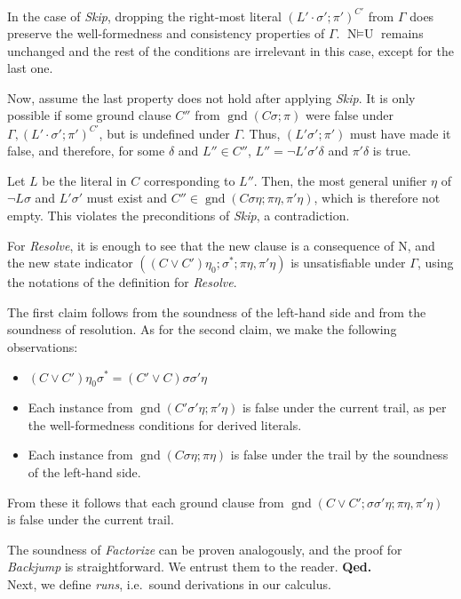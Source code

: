 \documentclass[a4paper]{article}
\newcommand{\mGnd}{\operatorname{gnd}} \newcommand{\mLVar}{\operatorname{lvar}} \newcommand{\mRVar}{\operatorname{rvar}} \newcommand{\mDmn}{\operatorname{dom}} \newcommand{\mRng}{\operatorname{rng}} \newcommand{\mMGU}{\operatorname{mgu}} \newcommand{\mDef}{\operatorname{def}} \newcommand{\mDomain}{\mathcal{D}} \newcommand{\mVar}{\operatorname{var}}
\newcommand{\finishproof}{{\bf Qed.}}
\newcommand{\leaveabit}{\\[6 pt]}
\begin{document}
In the case of \emph{Skip}, dropping the right-most literal $(L'\cdot\sigma'; \pi')^{C'}$ from $\Gamma$ does preserve 
the well-formedness and consistency properties of $\Gamma$. 
$\text{N} \models \text{U}$ remains unchanged and the rest 
of the conditions are irrelevant in this case, except for the last one.

Now, assume the last property does not hold after applying \emph{Skip}. It is only possible if some 
ground clause $C''$ from $\mGnd(C\sigma; \pi)$ were false under $\Gamma, (L'\cdot\sigma'; \pi')^{C'}$, but is undefined
under $\Gamma$. Thus, $(L'\sigma'; \pi')$ must have made it false, and therefore, for some $\delta$ and $L''\in C''$, 
$L'' = \neg L'\sigma'\delta$ and $\pi'\delta$ is true. 

Let $L$ be the literal in $C$ corresponding to $L''$. Then, the most general unifier $\eta$ of $\neg L\sigma$ and $L'\sigma'$ 
must exist and $C'' \in \mGnd(C\sigma\eta; \pi\eta, \pi'\eta)$, which is therefore not empty. This violates the 
preconditions of \emph{Skip}, a contradiction.

For \emph{Resolve}, it is enough to see that the new clause is a consequence of $\text{N}$, and the new 
state indicator $((C\lor C')\eta_0; \sigma^*; \pi\eta, \pi'\eta)$ is unsatisfiable under $\Gamma$, using the notations of 
the definition for \emph{Resolve}.

The first claim follows from the soundness of the left-hand side and from the soundness of resolution.
As for the second claim, we make the following observations:
\begin{itemize}
  \item $(C\lor C')\eta_0\sigma^* = (C' \lor C)\sigma\sigma'\eta$
	\item Each instance from $\mGnd(C'\sigma'\eta;\pi'\eta)$ is false under the current trail, as per the well-formedness conditions for derived literals.
	\item Each instance from $\mGnd(C\sigma\eta; \pi\eta)$ is false under the trail by the soundness of the left-hand side.
\end{itemize}
From these it follows that each ground clause from $\mGnd(C\lor C'; \sigma\sigma'\eta; \pi\eta, \pi'\eta)$ is false under the current trail.

The soundness of \emph{Factorize} can be proven analogously, and the proof for \emph{Backjump} is straightforward. 
We entrust them to the reader.
\finishproof\leaveabit
\noindent
Next, we define \emph{runs}, i.e.\ sound derivations in our calculus.
\end{document}

